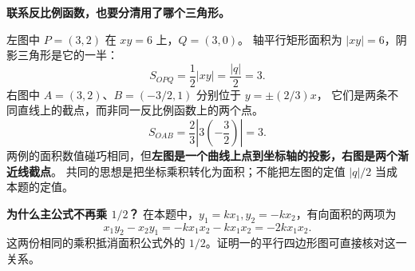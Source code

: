 \clearpage
\begin{explanationbox}
\textbf{联系反比例函数，也要分清用了哪个三角形。}
\begin{center}\end{center}
左图中 $P=(3,2)$ 在 $xy=6$ 上，$Q=(3,0)$。
轴平行矩形面积为 $|xy|=6$，阴影三角形是它的一半：
\[
 S_{OPQ}=\frac12|xy|=\frac{|q|}{2}=3.
\]
右图中 $A=(3,2)$、$B=(-3/2,1)$ 分别位于 $y=\pm(2/3)x$，
它们是两条不同直线上的截点，而非同一反比例函数上的两个点。
\[
 S_{OAB}=\frac23\left|3\left(-\frac32\right)\right|=3.
\]
两例的面积数值碰巧相同，但\textbf{左图是一个曲线上点到坐标轴的投影，右图是两个渐近线截点}。
共同的思想是把坐标乘积转化为面积；不能把左图的定值 $|q|/2$ 当成本题的定值。

\textbf{为什么主公式不再乘 $1/2$？}
在本题中，$y_1=kx_1,y_2=-kx_2$，有向面积的两项为
\[
 x_1y_2-x_2y_1=-kx_1x_2-kx_1x_2=-2kx_1x_2.
\]
这两份相同的乘积抵消面积公式外的 $1/2$。证明一的平行四边形图可直接核对这一关系。
\end{explanationbox}
